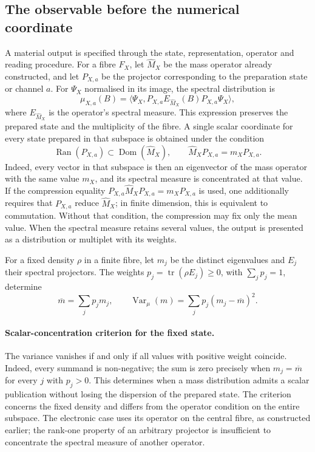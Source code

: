 \subsection{The observable before the numerical coordinate}
\label{subsec:vi-tipos-observable}

A material output is specified through the state, representation,
operator and reading procedure. For a fibre \(F_X\), let
\(\widehat M_X\) be the mass operator already constructed, and let \(P_{X,a}\)
be the projector corresponding to the preparation state or channel \(a\).
For \(\Psi_X\) normalised in its image, the spectral distribution is
\[
 \mu_{X,a}(B)
 =\langle\Psi_X,
   P_{X,a}E_{\widehat M_X}(B)P_{X,a}\Psi_X\rangle,
\]
where \(E_{\widehat M_X}\) is the operator's spectral measure. This
expression preserves the prepared state and the multiplicity of the fibre.
A single scalar coordinate for every state prepared in that subspace
is obtained under the condition
\[
 \operatorname{Ran}(P_{X,a})\subset\operatorname{Dom}(\widehat M_X),
 \qquad \widehat M_XP_{X,a}=m_XP_{X,a}.
\]
Indeed, every vector in that subspace is then an eigenvector of the
mass operator with the same value \(m_X\), and its spectral measure is
concentrated at that value. If the compression equality
\(P_{X,a}\widehat M_XP_{X,a}=m_XP_{X,a}\) is used, one additionally requires
that \(P_{X,a}\) reduce \(\widehat M_X\); in finite dimension, this is equivalent
to commutation. Without that condition, the compression may fix only
the mean value. When the spectral measure retains several values, the
output is presented as a distribution or multiplet with its weights.

For a fixed density \(\rho\) in a finite fibre, let \(m_j\)
be the distinct eigenvalues and \(E_j\) their spectral projectors.
The weights \(p_j=\operatorname{tr}(\rho E_j)\geq0\), with
\(\sum_jp_j=1\), determine
\[
 \overline m=\sum_jp_jm_j,\qquad
 \operatorname{Var}_{\mu}(m)=\sum_jp_j(m_j-\overline m)^2.
\]
\paragraph{Scalar-concentration criterion for the fixed state.}
The variance vanishes if and only if all values with positive weight
coincide. Indeed, every summand is non-negative; the sum is zero
precisely when \(m_j=\overline m\) for every \(j\) with
\(p_j>0\). This determines when a mass distribution admits
a scalar publication without losing the dispersion of the prepared state.
The criterion concerns the fixed density and differs from the
operator condition on the entire subspace. The electronic case uses its
operator on the central fibre, as constructed earlier;
the rank-one property of an arbitrary projector is insufficient to concentrate
the spectral measure of another operator.

